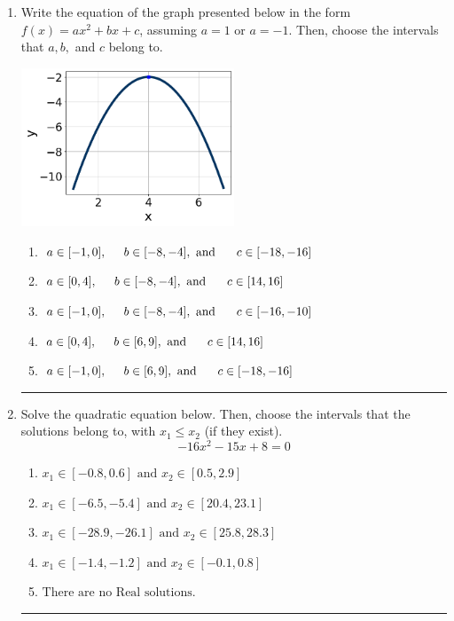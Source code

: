 \documentclass[14pt]{extbook}
\newcommand{\litem}[1]{\item#1\hspace*{-1cm}\rule{\textwidth}{0.4pt}}
\begin{document}
\begin{enumerate}
{\begin{enumerate}[label=\Alph*.]
\end{enumerate} }
\litem{
Write the equation of the graph presented below in the form $f(x)=ax^2+bx+c$, assuming  $a=1$ or $a=-1$. Then, choose the intervals that $a, b,$ and $c$ belong to.
\begin{center}
    \includegraphics[width=0.5\textwidth]{../Figures/quadraticGraphToEquationB.png}
\end{center}
\begin{enumerate}[label=\Alph*.]
\item \( a \in [-1, 0], \hspace*{5mm} b \in [-8, -4], \text{ and } \hspace*{5mm} c \in [-18, -16] \)
\item \( a \in [0, 4], \hspace*{5mm} b \in [-8, -4], \text{ and } \hspace*{5mm} c \in [14, 16] \)
\item \( a \in [-1, 0], \hspace*{5mm} b \in [-8, -4], \text{ and } \hspace*{5mm} c \in [-16, -10] \)
\item \( a \in [0, 4], \hspace*{5mm} b \in [6, 9], \text{ and } \hspace*{5mm} c \in [14, 16] \)
\item \( a \in [-1, 0], \hspace*{5mm} b \in [6, 9], \text{ and } \hspace*{5mm} c \in [-18, -16] \)

\end{enumerate} }
\litem{
Solve the quadratic equation below. Then, choose the intervals that the solutions belong to, with $x_1 \leq x_2$ (if they exist).\[ -16x^{2} -15 x + 8 = 0 \]\begin{enumerate}[label=\Alph*.]
\item \( x_1 \in [-0.8, 0.6] \text{ and } x_2 \in [0.5, 2.9] \)
\item \( x_1 \in [-6.5, -5.4] \text{ and } x_2 \in [20.4, 23.1] \)
\item \( x_1 \in [-28.9, -26.1] \text{ and } x_2 \in [25.8, 28.3] \)
\item \( x_1 \in [-1.4, -1.2] \text{ and } x_2 \in [-0.1, 0.8] \)
\item \( \text{There are no Real solutions.} \)


\end{enumerate}}
\end{enumerate}
\end{document}
